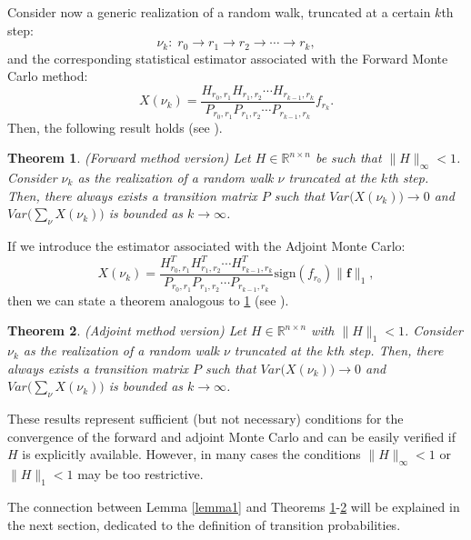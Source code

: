\documentclass[final,leqno,onefignum,onetabnum]{siamltex1213}
\newtheorem{thm}{Theorem}
\begin{document}
Consider now a generic realization of a random walk, truncated at a certain $k$th step:
\[
 \nu_k:\; r_0\rightarrow r_1 \rightarrow r_2 \rightarrow \cdots \rightarrow r_k,
\]
and the corresponding statistical estimator associated with the Forward Monte 
Carlo method:
\[
 X(\nu_k)=\frac{H_{r_0,r_1}H_{r_1,r_2}\cdots
H_{r_{k-1},r_k}}{P_{r_0,r_1}P_{r_1,r_2}\cdots P_{r_{k-1},r_k}}f_{r_k}.
\]
Then, the following result holds (see \cite{MASC2013}).
\begin{thm}\textit{(Forward method version)}
Let $H\in \mathbb{R}^{n\times n}$ be such that $\lVert H\rVert_{\infty}<1$.
Consider $\nu_k$ as the realization of a random walk $\nu$ truncated at the
$k$th step. Then,
there always exists a
transition matrix $P$ such that
$Var\Big(X(\nu_k)\Big)\rightarrow 0$ and
$Var\Big(\sum_{\nu}X(\nu_k)\Big)$ is bounded as $k\rightarrow \infty$.
\label{for_thm}
\end{thm}

If we introduce the estimator associated with the Adjoint Monte Carlo:
\[
 X(\nu_k)=\frac{H^T_{r_0,r_1}H^T_{r_1,r_2}\cdots
H^T_{r_{k-1},r_k}}{P_{r_0,r_1}P_{r_1,r_2}\cdots
P_{r_{k-1},r_k}}\text{sign}(f_{r_0})\lVert \mathbf{f}\rVert_1,
\]
then we can state a
theorem analogous to \ref{for_thm} (see \cite{MASC2013}).

\begin{thm}\textit{(Adjoint method version)}
 Let $H\in \mathbb{R}^{n\times n}$ with $\lVert H\rVert_{1}<1$.
Consider $\nu_k$ as the realization of a random walk $\nu$ truncated at the
$k$th step. Then,
there always exists a
transition matrix $P$ such that
$Var\Big(X(\nu_k)\Big)\rightarrow 0$ and
$Var\Big(\sum_{\nu}X(\nu_k)\Big)$ is bounded as $k\rightarrow \infty$.
\label{adj_thm}
\end{thm}

These results represent sufficient (but not necessary) conditions
for the convergence
of the forward and adjoint Monte Carlo and can be easily verified if $H$ is explicitly
available.
However, in many cases the conditions $\lVert H\rVert_{\infty}<1$ or
$\lVert H\rVert_1<1$ may be too restrictive.

The connection between Lemma \ref{lemma1} and Theorems \ref{for_thm}-\ref{adj_thm}
will be explained in 
the next section, dedicated to the definition of transition probabilities.
\end{document}
